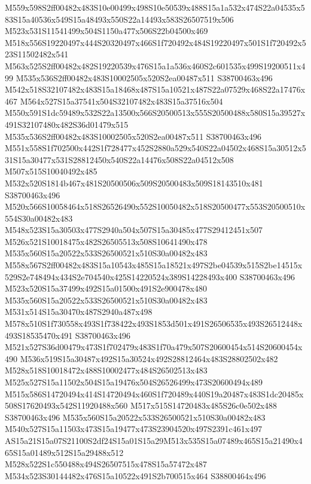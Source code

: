\documentclass{article}
\begin{document}
\begin{multicols}{2}

M559x598S2ff00482x483S10e00499x498S10e50539x488S15a1a532x474S22a04535x583S15a40536x549S15a48493x550S22a14493x583S26507519x506 M523x531S11541499x504S1150a477x506S22b04500x469 M518x556S19220497x444S20320497x466S1f720492x484S19220497x501S1f720492x523S11502482x541 M563x525S2ff00482x482S19220539x476S15a1a536x460S2c601535x499S19200511x499 M535x536S2ff00482x483S10002505x520S2ea00487x511 S38700463x496 M542x518S32107482x483S15a18468x487S15a10521x487S22a07529x468S22a17476x467 M564x527S15a37541x504S32107482x483S15a37516x504 M550x591S1dc59489x532S22a13500x566S20500513x555S20500488x580S15a39527x491S32107480x482S36d01479x515 M535x536S2ff00482x483S10002505x520S2ea00487x511 S38700463x496 M551x558S1f702500x442S1f728477x452S2880a529x540S22a04502x468S15a30512x531S15a30477x531S28812450x540S22a14476x508S22a04512x508 M507x515S10040492x485 M532x520S1814b467x481S20500506x509S20500483x509S18143510x481 S38700463x496 M520x566S10058464x518S26526490x552S10050482x518S20500477x553S20500510x554S30a00482x483 M548x523S15a30503x477S2940a504x507S15a30485x477S29412451x507 M526x521S10018475x482S26505513x508S10641490x478 M535x560S15a20522x533S26500521x510S30a00482x483 M558x567S2ff00482x483S15a10543x485S15a18521x497S2be04539x515S2be14515x529S2e748494x434S2e704540x425S14220524x389S14228493x400 S38700463x496 M523x520S15a37499x492S15a01500x491S2e900478x480 M535x560S15a20522x533S26500521x510S30a00482x483 M531x514S15a30470x487S2940a487x498 M578x510S1f730558x493S1f738422x493S1853d501x491S26506535x493S26512448x493S18535470x491 S38700463x496 M521x527S36d00479x473S1f702479x483S1f70a479x507S20600454x514S20600454x490 M536x519S15a30487x492S15a30524x492S28812464x483S28802502x482 M528x518S10018472x488S10002477x484S26502513x483 M525x527S15a11502x504S15a19476x504S26526499x473S20600494x489 M515x586S14720494x414S14720494x460S1f720489x440S19a20487x483S1dc20485x508S17620493x542S11920488x560 M517x515S14720483x485S26c0e502x488 S38700463x496 M535x560S15a20522x533S26500521x510S30a00482x483 M540x527S15a11503x473S15a19477x473S23904520x497S2391c461x497 AS15a21S15a07S21100S2df24S15a01S15a29M513x535S15a07489x465S15a21490x465S15a01489x512S15a29488x512 M528x522S1c550488x494S26507515x478S15a57472x487 M534x523S30144482x476S15a10522x491S2b700515x464 S38800464x496



\end{multicols}
\end{document}
